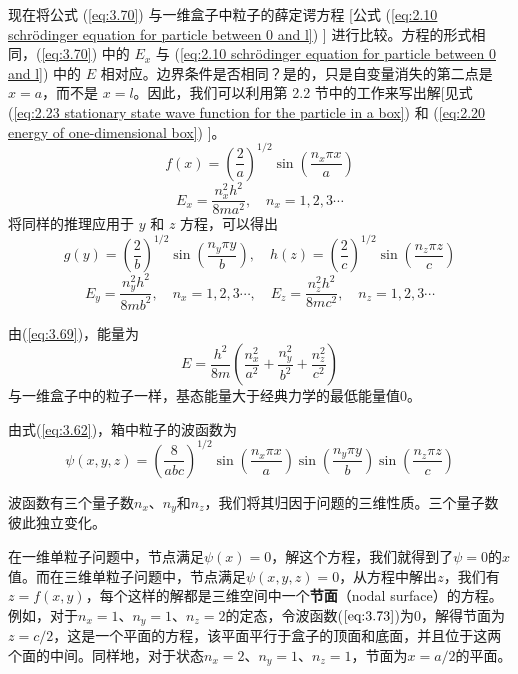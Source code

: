 	现在将公式 (\ref{eq:3.70}) 与一维盒子中粒子的薛定谔方程 [公式 (\ref{eq:2.10 schrödinger equation for particle between 0 and l}) ] 进行比较。方程的形式相同，(\ref{eq:3.70}) 中的 $E_x$ 与 (\ref{eq:2.10 schrödinger equation for particle between 0 and l}) 中的 $E$ 相对应。边界条件是否相同？是的，只是自变量消失的第二点是 $x=a$，而不是 $x=l$。因此，我们可以利用第 2.2 节中的工作来写出解[见式 (\ref{eq:2.23 stationary state wave function for the particle in a box}) 和 (\ref{eq:2.20 energy of one-dimensional box}) ]。
	\begin{equation*}
		f\left(x\right) = \left(\frac{2}{a}\right)^{1/2}\sin\left(\frac{n_x\pi x}{a}\right)
	\end{equation*}
	\begin{equation*}
		E_x = \frac{n_x^2h^2}{8ma^2}, \quad n_x = 1,2,3\cdots
	\end{equation*}
	将同样的推理应用于 $y$ 和 $z$ 方程，可以得出
	\begin{equation*}
		g\left(y\right) = \left(\frac{2}{b}\right)^{1/2}\sin\left(\frac{n_y\pi y}{b}\right), \quad h\left(z\right) = \left(\frac{2}{c}\right)^{1/2}\sin\left(\frac{n_z\pi z}{c}\right)
	\end{equation*}
	\begin{equation*}
		E_y = \frac{n_y^2h^2}{8mb^2}, \quad n_x = 1,2,3\cdots, \quad E_z = \frac{n_z^2h^2}{8mc^2}, \quad n_z = 1,2,3\cdots
	\end{equation*}

	由(\ref{eq:3.69})，能量为
	\begin{equation}
		E = \frac{h^2}{8m}\left(\frac{n_x^2}{a^2}+\frac{n_y^2}{b^2}+\frac{n_z^2}{c^2}\right)
		\label{eq:3.72}
	\end{equation}
	与一维盒子中的粒子一样，基态能量大于经典力学的最低能量值0。

	由式(\ref{eq:3.62})，箱中粒子的波函数为
	\begin{equation}
		\psi\left(x,y,z\right) = \left(\frac{8}{abc}\right)^{1/2}\sin\left(\frac{n_x\pi x}{a}\right)\sin\left(\frac{n_y\pi y}{b}\right)\sin\left(\frac{n_z\pi z}{c}\right)
		\label{eq:3.73}
	\end{equation}

	波函数有三个量子数$n_x$、$n_y$和$n_z$，我们将其归因于问题的三维性质。三个量子数彼此独立变化。

	在一维单粒子问题中，节点满足$\psi\left(x\right)=0$，解这个方程，我们就得到了$\psi = 0$的$x$值。而在三维单粒子问题中，节点满足$\psi\left(x,y,z\right) = 0$，从方程中解出$z$，我们有$z=f\left(x,y\right)$，每个这样的解都是三维空间中一个\textbf{节面}（nodal surface）的方程。例如，对于$n_x=1$、$n_y=1$、$n_z=2$的定态，令波函数($\ref{eq:3.73}$)为0，解得节面为$z=c/2$，这是一个平面的方程，该平面平行于盒子的顶面和底面，并且位于这两个面的中间。同样地，对于状态$n_x=2$、$n_y=1$、$n_z=1$，节面为$x=a/2$的平面。

